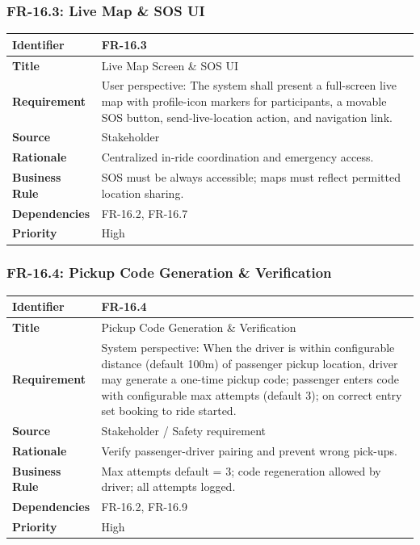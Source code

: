 \subsubsection{FR-16.3: Live Map \& SOS UI}

\begin{longtable}{|p{3cm}|p{12cm}|}
\hline
\rowcolor{lightgray!30}
\textbf{Identifier} & FR-16.3 \\
\hline
\textbf{Title} & Live Map Screen \& SOS UI \\
\hline
\textbf{Requirement} & User perspective: The system shall present a full-screen live map with profile-icon markers for participants, a movable SOS button, send-live-location action, and navigation link. \\
\hline
\textbf{Source} & Stakeholder \\
\hline
\textbf{Rationale} & Centralized in-ride coordination and emergency access. \\
\hline
\textbf{Business Rule} & SOS must be always accessible; maps must reflect permitted location sharing. \\
\hline
\textbf{Dependencies} & FR-16.2, FR-16.7 \\
\hline
\textbf{Priority} & High \\
\hline
\end{longtable}

\subsubsection{FR-16.4: Pickup Code Generation \& Verification}

\begin{longtable}{|p{3cm}|p{12cm}|}
\hline
\rowcolor{lightgray!30}
\textbf{Identifier} & FR-16.4 \\
\hline
\textbf{Title} & Pickup Code Generation \& Verification \\
\hline
\textbf{Requirement} & System perspective: When the driver is within configurable distance (default 100m) of passenger pickup location, driver may generate a one-time pickup code; passenger enters code with configurable max attempts (default 3); on correct entry set booking to ride started. \\
\hline
\textbf{Source} & Stakeholder / Safety requirement \\
\hline
\textbf{Rationale} & Verify passenger-driver pairing and prevent wrong pick-ups. \\
\hline
\textbf{Business Rule} & Max attempts default = 3; code regeneration allowed by driver; all attempts logged. \\
\hline
\textbf{Dependencies} & FR-16.2, FR-16.9 \\
\hline
\textbf{Priority} & High \\
\hline
\end{longtable}

